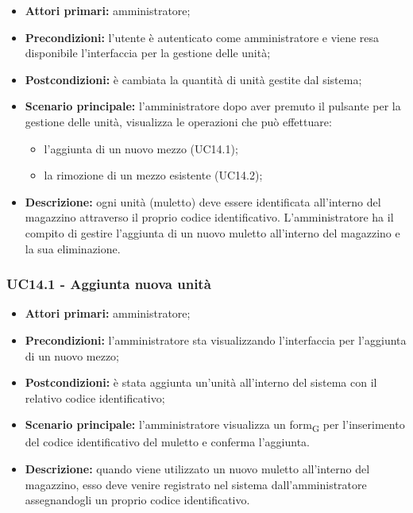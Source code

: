 \begin{itemize}
	\item 	\textbf{Attori primari:} amministratore;
	\item 	\textbf{Precondizioni:} l'utente è autenticato come amministratore e viene resa disponibile l'interfaccia per la gestione delle unità;
	\item 	\textbf{Postcondizioni:} è cambiata la quantità di unità gestite dal sistema;
	\item 	\textbf{Scenario principale:} l'amministratore dopo aver premuto il pulsante per la gestione delle unità, visualizza le operazioni che può effettuare:
	\begin{itemize}
		\item l'aggiunta di un nuovo mezzo (UC14.1);
		\item la rimozione di un mezzo esistente (UC14.2);
	\end{itemize}
	\item 	\textbf{Descrizione:} ogni unità (muletto) deve essere identificata all'interno del magazzino attraverso il proprio codice identificativo. L'amministratore ha il compito di gestire l'aggiunta di un nuovo muletto all'interno del magazzino e la sua eliminazione.
\end{itemize}

\subsubsection{UC14.1 - Aggiunta nuova unità}
\begin{itemize}
	\item 	\textbf{Attori primari:} amministratore;
	\item 	\textbf{Precondizioni:} l'amministratore sta visualizzando l'interfaccia per l'aggiunta di un nuovo mezzo;
	\item 	\textbf{Postcondizioni:} è stata aggiunta un'unità all'interno del sistema con il relativo codice identificativo;
	\item 	\textbf{Scenario principale:} l'amministratore visualizza un form\textsubscript{G} per l'inserimento del codice identificativo del muletto e conferma l'aggiunta.
	\item 	\textbf{Descrizione:} quando viene utilizzato un nuovo muletto all'interno del magazzino, esso deve venire registrato nel sistema dall'amministratore assegnandogli un proprio codice identificativo.

\end{itemize}


